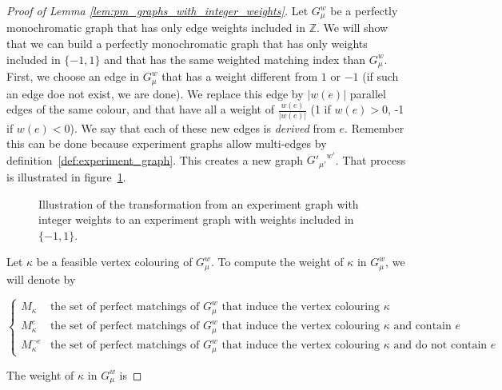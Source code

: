 \begin{proof}[Proof of Lemma \ref{lem:pm_graphs_with_integer_weights}]
    Let $G_\mu^w$ be a perfectly monochromatic graph that has only edge weights included in $\mathbb{Z}$.
    We will show that we can build a perfectly monochromatic graph that has only weights included in $\{-1, 1\}$ and that has the same weighted matching index than $G_\mu^w$. \\

    First, we choose an edge in $G_\mu^w$ that has a weight different from $1$ or $-1$ (if such an edge doe not exist, we are done).
    We replace this edge by $|w(e)|$ parallel edges of the same colour, and that have all a weight of $\frac{w(e)}{|w(e)|}$ (1 if $w(e) > 0$, -1 if $w(e) < 0$).
    We say that each of these new edges is \textit{derived} from $e$.
    Remember this can be done because experiment graphs allow multi-edges by definition~\ref{def:experiment_graph}.
    This creates a new graph ${G'_{\mu'}}^{w'}$.
    That process is illustrated in figure~\ref{fig:demo_integers}.\\

    \begin{figure}[H]
        \caption{Illustration of the transformation from an experiment graph with integer weights to an experiment graph with weights included in $\{-1, 1\}$.}
        \label{fig:demo_integers}
    \end{figure}

    Let $\kappa$ be a feasible vertex colouring of $G_\mu^w$.
    To compute the weight of $\kappa$ in $G_\mu^w$, we will denote by
    \begin{center}
        $\left\{
            \begin{array}{ll}
                M_{\kappa}          & \mbox{the set of perfect matchings of } G_\mu^w \mbox{ that induce the vertex colouring } \kappa \\
                M_{\kappa}^e        & \mbox{the set of perfect matchings of } G_\mu^w \mbox{ that induce the vertex colouring } \kappa \mbox{ and contain } e \\
                M_{\kappa}^{\neg e} & \mbox{the set of perfect matchings of } G_\mu^w \mbox{ that induce the vertex colouring } \kappa \mbox{ and do not contain } e
            \end{array}
        \right.$
    \end{center}

    The weight of $\kappa$ in $G_\mu^w$ is


\end{proof}
